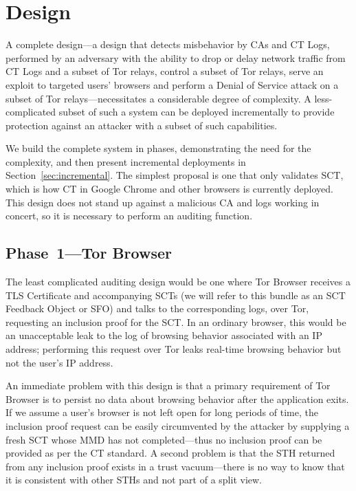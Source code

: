 \section{Design} \label{sec:base}

A complete design---a design that detects misbehavior by CAs and CT Logs,
performed by an adversary with the ability to drop or delay network traffic from
CT Logs and a subset of Tor relays, control a subset of Tor relays, serve an
exploit to targeted users' browsers and perform a Denial of Service attack on a
subset of Tor relays---necessitates a considerable degree of complexity. A
less-complicated subset of such a system can be deployed incrementally to
provide protection against an attacker with a subset of such capabilities.

We build the complete system in phases, demonstrating the need for the
complexity, and then present incremental deployments in
Section~\ref{sec:incremental}. The simplest proposal is one that only validates
SCT, which is how CT in Google Chrome and other browsers is currently deployed.
This design does not stand up against a malicious CA and logs working in
concert, so it is necessary to perform an auditing function.

\subsection{Phase~1---Tor Browser} \label{sec:base:phase1}

The least complicated auditing design would be one where Tor Browser receives a
TLS Certificate and accompanying SCTs (we will refer to this bundle as an SCT
Feedback Object or SFO) and talks to the corresponding logs, over Tor,
requesting an inclusion proof for the SCT. In an ordinary browser, this would be
an unacceptable leak to the log of browsing behavior associated with an IP
address; performing this request over Tor leaks real-time browsing behavior but
not the user's IP address.

An immediate problem with this design is that a primary requirement of Tor
Browser is to persist no data about browsing behavior after the application
exits. If we assume a user's browser is not left open for long periods of time,
the inclusion proof request can be easily circumvented by the attacker by
supplying a fresh SCT whose MMD has not completed---thus no inclusion proof can
be provided as per the CT standard. A second problem is that the STH returned
from any inclusion proof exists in a trust vacuum---there is no way to know that
it is consistent with other STHs and not part of a split view.


